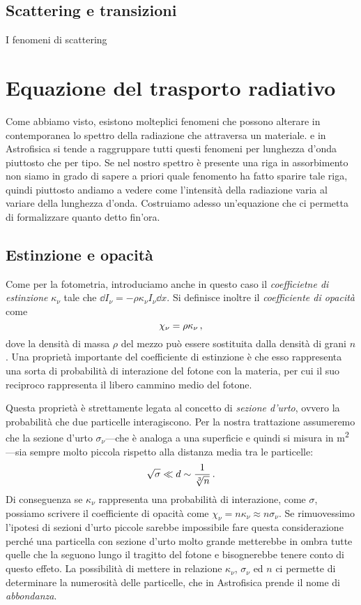     \subsection{Scattering e transizioni}
        I fenomeni di scattering 
\section{Equazione del trasporto radiativo}
    Come abbiamo visto, esistono molteplici fenomeni che possono alterare in contemporanea lo spettro della radiazione che attraversa un materiale. e in Astrofisica si tende a raggruppare tutti questi fenomeni per lunghezza d'onda piuttosto che per tipo. Se nel nostro spettro è presente una riga in assorbimento non siamo in grado di sapere a priori quale fenomento ha fatto sparire tale riga, quindi piuttosto andiamo a vedere come l'intensità della radiazione varia al variare della lunghezza d'onda. Costruiamo adesso un'equazione che ci permetta di formalizzare quanto detto fin'ora.
    \subsection{Estinzione e opacità}
        Come per la fotometria, introduciamo anche in questo caso il \emph{coefficietne di estinzione} $\kappa_\nu$ tale che $\dd{I_\nu} = -\rho\kappa_{\nu}I_{\nu}\dd{x}$. Si definisce inoltre il \emph{coefficiente di opacità} come
        \begin{equation}
            \chi_\nu = \rho\kappa_\nu
            \,,
        \end{equation}
        dove la densità di massa $\rho$ del mezzo può essere sostituita dalla densità di grani $n$. Una proprietà importante del coefficiente di estinzione è che esso rappresenta una sorta di probabilità di interazione del fotone con la materia, per cui il suo reciproco rappresenta il libero cammino medio del fotone.

        Questa proprietà è strettamente legata al concetto di \emph{sezione d'urto}, ovvero la probabilità che due particelle interagiscono. Per la nostra trattazione assumeremo che la sezione d'urto $\sigma_{\nu}$---che è analoga a una superficie e quindi si misura in \unit{m^2}---sia sempre molto piccola rispetto alla distanza media tra le particelle:
        \begin{equation*}
            \sqrt{\sigma} \ll d \sim \frac{1}{\sqrt[3]{n}}
            \,.
        \end{equation*}
        Di conseguenza se $\kappa_\nu$ rappresenta una probabilità di interazione, come $\sigma$, possiamo scrivere il coefficiente di opacità come $\chi_\nu = n\kappa_\nu \approx n\sigma_{\nu}$. Se rimuovessimo l'ipotesi di sezioni d'urto piccole sarebbe impossibile fare questa considerazione perché una particella con sezione d'urto molto grande metterebbe in ombra tutte quelle che la seguono lungo il tragitto del fotone e bisognerebbe tenere conto di questo effeto. La possibilità di mettere in relazione $\kappa_\nu$, $\sigma_\nu$ ed $n$ ci permette di determinare la numerosità delle particelle, che in Astrofisica prende il nome di \emph{abbondanza}.

